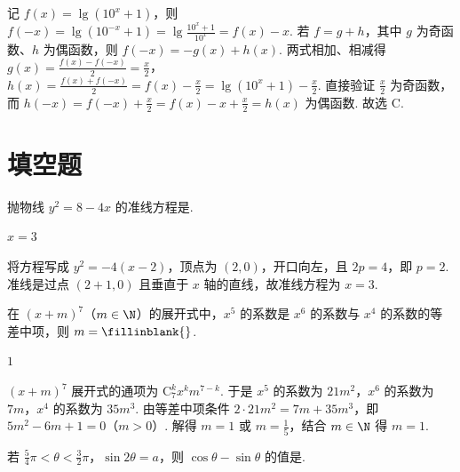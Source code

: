 \begin{solution}
记 \(f(x) = \lg \left(10^x + 1\right)\)，则 \(f(-x) = \lg \left(10^{-x} + 1\right) = \lg \frac{10^x + 1}{10^x} = f(x) - x\). 若 \(f = g + h\)，其中 \(g\) 为奇函数、\(h\) 为偶函数，则 \(f(-x) = -g(x) + h(x)\). 两式相加、相减得 \(g(x) = \frac{f(x) - f(-x)}{2} = \frac{x}{2}\)，\(h(x) = \frac{f(x) + f(-x)}{2} = f(x) - \frac{x}{2} = \lg \left(10^x + 1\right) - \frac{x}{2}\). 直接验证 \(\frac{x}{2}\) 为奇函数，而 \(h(-x) = f(-x) + \frac{x}{2} = f(x) - x + \frac{x}{2} = h(x)\) 为偶函数. 故选 C.
\end{solution}

\section{填空题}

\begin{problem}
抛物线 \(y^2 = 8 - 4x\) 的准线方程是\fillinblank{}.
\end{problem}

\begin{answer}
\(x = 3\)
\end{answer}

\begin{solution}
将方程写成 \(y^2 = -4(x - 2)\)，顶点为 \((2, 0)\)，开口向左，且 \(2p = 4\)，即 \(p = 2\). 准线是过点 \((2 + 1, 0)\) 且垂直于 \(x\) 轴的直线，故准线方程为 \(x = 3\).
\end{solution}

\begin{problem}
在 \((x + m)^7\)（\(m \in \N\)）的展开式中，\(x^5\) 的系数是 \(x^6\) 的系数与 \(x^4\) 的系数的等差中项，则 \(m =\fillinblank{}\).
\end{problem}

\begin{answer}
\(1\)
\end{answer}

\begin{solution}
\((x + m)^7\) 展开式的通项为 \(\mathrm C_7^k x^k m^{7-k}\). 于是 \(x^5\) 的系数为 \(21m^2\)，\(x^6\) 的系数为 \(7m\)，\(x^4\) 的系数为 \(35m^3\). 由等差中项条件 \(2 \cdot 21m^2 = 7m + 35m^3\)，即 \(5m^2 - 6m + 1 = 0\)（\(m > 0\)）. 解得 \(m = 1\) 或 \(m = \frac{1}{5}\)，结合 \(m \in \N\) 得 \(m = 1\).
\end{solution}

\begin{problem}
若 \(\frac{5}{4}\pi < \theta < \frac{3}{2}\pi\)，\(\sin 2\theta = a\)，则 \(\cos \theta - \sin \theta\) 的值是\fillinblank{}.
\end{problem}

